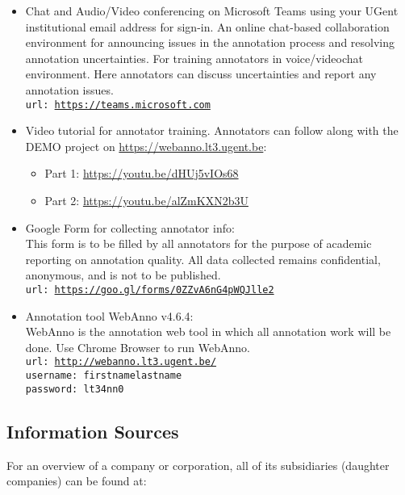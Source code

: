 {\begin{itemize}[leftmargin=*]

    \item Chat and Audio/Video conferencing on Microsoft Teams using your UGent institutional email address for sign-in. An online chat-based collaboration environment for announcing issues in the annotation process and resolving annotation uncertainties. For training annotators in voice/videochat environment. Here annotators can discuss uncertainties and report any annotation issues.
\\
        \texttt{url: \url{https://teams.microsoft.com}}
    
    \item Video tutorial for annotator training. Annotators can follow along with the DEMO project on \url{https://webanno.lt3.ugent.be}:
    \begin{itemize}
        \item Part 1: \url{https://youtu.be/dHUj5vIOs68}
        \item Part 2: \url{https://youtu.be/alZmKXN2b3U}
    \end{itemize}

    \item Google Form for collecting annotator info:\\
        This form is to be filled by all annotators for the purpose of academic reporting on annotation quality. All data collected remains confidential, anonymous, and is not to be published.\\
        \texttt{url: \url{https://goo.gl/forms/0ZZvA6nG4pWQJlle2}}
    
    \item Annotation tool WebAnno v4.6.4:\\
        WebAnno is the annotation web tool in which all annotation work will be done.
        Use Chrome Browser to run WebAnno.\\
        \texttt{url: \url{http://webanno.lt3.ugent.be/}}\\
        \texttt{username: firstnamelastname}\\
        \texttt{password: lt34nn0}
    
        
\end{itemize}

\subsection{Information Sources}
\label{subsec:resources}
For an overview of a company or corporation, all of its subsidiaries (daughter companies) can be found at:

}

